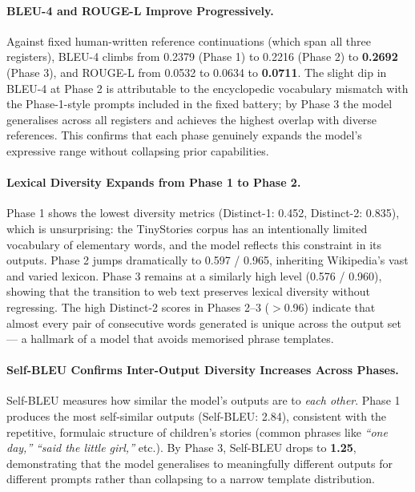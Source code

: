 \documentclass[12pt]{article}
\begin{document}
\paragraph{BLEU-4 and ROUGE-L Improve Progressively.}
Against fixed human-written reference continuations (which span all three registers), BLEU-4 climbs from 0.2379 (Phase 1) to 0.2216 (Phase 2) to \textbf{0.2692} (Phase 3), and ROUGE-L from 0.0532 to 0.0634 to \textbf{0.0711}. The slight dip in BLEU-4 at Phase 2 is attributable to the encyclopedic vocabulary mismatch with the Phase-1-style prompts included in the fixed battery; by Phase 3 the model generalises across all registers and achieves the highest overlap with diverse references. This confirms that each phase genuinely expands the model's expressive range without collapsing prior capabilities.

\paragraph{Lexical Diversity Expands from Phase 1 to Phase 2.}
Phase 1 shows the lowest diversity metrics (Distinct-1: 0.452, Distinct-2: 0.835), which is unsurprising: the TinyStories corpus has an intentionally limited vocabulary of elementary words, and the model reflects this constraint in its outputs. Phase 2 jumps dramatically to 0.597 / 0.965, inheriting Wikipedia's vast and varied lexicon. Phase 3 remains at a similarly high level (0.576 / 0.960), showing that the transition to web text preserves lexical diversity without regressing. The high Distinct-2 scores in Phases 2--3 ($>$0.96) indicate that almost every pair of consecutive words generated is unique across the output set — a hallmark of a model that avoids memorised phrase templates.

\paragraph{Self-BLEU Confirms Inter-Output Diversity Increases Across Phases.}
Self-BLEU measures how similar the model's outputs are to \emph{each other}. Phase 1 produces the most self-similar outputs (Self-BLEU: 2.84), consistent with the repetitive, formulaic structure of children's stories (common phrases like \textit{``one day,''} \textit{``said the little girl,''} etc.). By Phase 3, Self-BLEU drops to \textbf{1.25}, demonstrating that the model generalises to meaningfully different outputs for different prompts rather than collapsing to a narrow template distribution.
\end{document}
